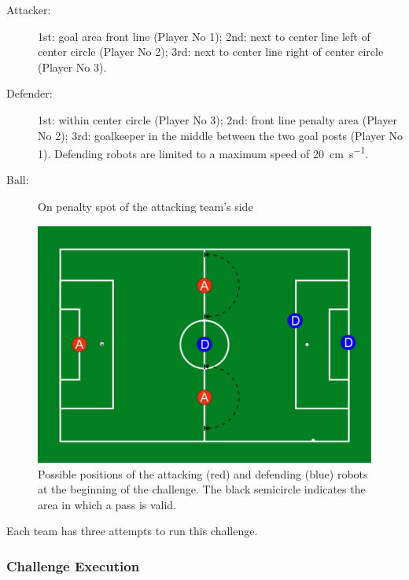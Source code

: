         \begin{description}
            \item[Attacker:] 1st: goal area front line (Player No 1); 2nd: next to center line left of center circle (Player No 2); 3rd: next to center line right of center circle (Player No 3).
            \item[Defender:] 1st: within center circle (Player No 3); 2nd: front line penalty area (Player No 2); 3rd: goalkeeper in the middle between the two goal posts (Player No 1). Defending robots are limited to a maximum speed of \qty{20}{\cm \per \second}.
            \item[Ball:] On penalty spot of the attacking team's side
        \end{description}

        \begin{figure}[t!]
            \begin{center}
                \leavevmode
                \includegraphics[width=1\columnwidth]{figs/ball_handling_positions.pdf}
                \caption{Possible positions of the attacking (red) and defending (blue) robots at the beginning of the challenge. The black semicircle indicates the area in which a pass is valid.}
                \label{fig:ball_handling_positions}
            \end{center}
        \end{figure}

    Each team has three attempts to run this challenge.

    \subsubsection{Challenge Execution}

